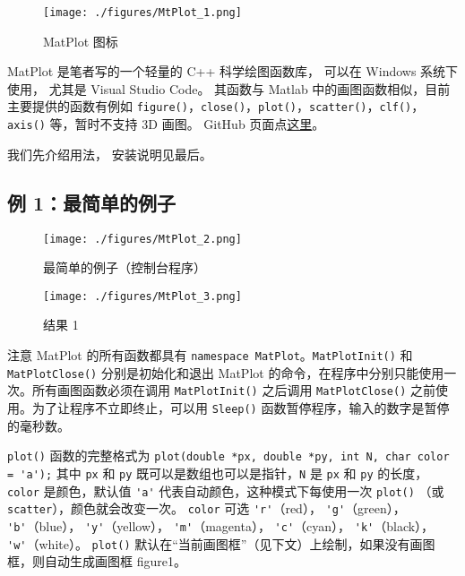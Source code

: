 
\begin{figure}[ht]
\centering
\texttt{[image: ./figures/MtPlot\_1.png]}
\caption{MatPlot 图标} \label{MtPlot_fig1}
\end{figure}

MatPlot 是笔者写的一个轻量的 C++ 科学绘图函数库， 可以在 Windows 系统下使用， 尤其是 Visual Studio Code。 其函数与 Matlab 中的画图函数相似，目前主要提供的函数有例如 \verb|figure()|，\verb|close()|，\verb|plot()|，\verb|scatter()|，\verb|clf()|，\verb|axis()| 等，暂时不支持 3D 画图。 GitHub 页面点\href{https://github.com/MacroUniverse/MatPlot}{这里}。

我们先介绍用法， 安装说明见最后。

\subsection{例 1：最简单的例子}

\begin{figure}[ht]
\centering
\texttt{[image: ./figures/MtPlot\_2.png]}
\caption{最简单的例子（控制台程序）} \label{MtPlot_fig2}
\end{figure}

\begin{figure}[ht]
\centering
\texttt{[image: ./figures/MtPlot\_3.png]}
\caption{结果 1} \label{MtPlot_fig3}
\end{figure}

注意 MatPlot 的所有函数都具有 \verb|namespace MatPlot|。\verb|MatPlotInit()| 和 \verb|MatPlotClose()| 分别是初始化和退出 MatPlot 的命令，在程序中分别只能使用一次。所有画图函数必须在调用 \verb|MatPlotInit()| 之后调用 \verb|MatPlotClose()| 之前使用。为了让程序不立即终止，可以用 \verb|Sleep()| 函数暂停程序，输入的数字是暂停的毫秒数。

\verb|plot()| 函数的完整格式为
\verb|plot(double *px, double *py, int N, char color = 'a');|
其中 \verb|px| 和 \verb|py| 既可以是数组也可以是指针，\verb|N| 是 \verb|px| 和 \verb|py| 的长度，\verb|color| 是颜色，默认值 \verb|'a'| 代表自动颜色，这种模式下每使用一次 \verb|plot()| （或 \verb|scatter|），颜色就会改变一次。 \verb|color| 可选
\verb|'r'|（red），
\verb|'g'|（green），
\verb|'b'|（blue），
\verb|'y'|（yellow），
\verb|'m'|（magenta），
\verb|'c'|（cyan），
\verb|'k'|（black），
\verb|'w'|（white）。
\verb|plot()| 默认在“当前画图框”（见下文）上绘制，如果没有画图框，则自动生成画图框 figure1。

